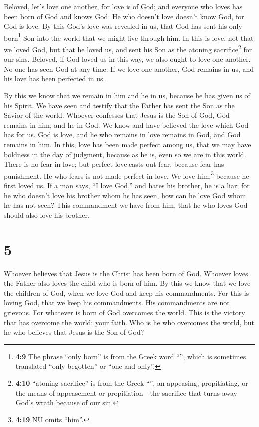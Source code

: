  Beloved, let's love one another, for love is of God; and
everyone who loves has been born of God and knows God.  He
who doesn't love doesn't know God, for God is love.  By
this God's love was revealed in us, that God has sent his only
born\footnote{\textbf{4:9} The phrase ``only born'' is from the Greek
  word ``'', which is sometimes translated ``only
  begotten'' or ``one and only''.} Son into the world that we might live
through him.  In this is love, not that we loved God, but
that he loved us, and sent his Son as the atoning sacrifice\footnote{\textbf{4:10}
  ``atoning sacrifice'' is from the Greek ``'', an
  appeasing, propitiating, or the means of appeasement or
  propitiation---the sacrifice that turns away God's wrath because of
  our sin.} for our sins.  Beloved, if God loved us in
this way, we also ought to love one another.  No one has
seen God at any time. If we love one another, God remains in us, and his
love has been perfected in us.

 By this we know that we remain in him and he in us,
because he has given us of his Spirit.  We have seen and
testify that the Father has sent the Son as the Savior of the world.
 Whoever confesses that Jesus is the Son of God, God
remains in him, and he in God.  We know and have believed
the love which God has for us. God is love, and he who remains in love
remains in God, and God remains in him.  In this, love
has been made perfect among us, that we may have boldness in the day of
judgment, because as he is, even so we are in this world.
 There is no fear in love; but perfect love casts out
fear, because fear has punishment. He who fears is not made perfect in
love.  We love him,\footnote{\textbf{4:19} NU omits
  ``him''.} because he first loved us.  If a man says,
``I love God,'' and hates his brother, he is a liar; for he who doesn't
love his brother whom he has seen, how can he love God whom he has not
seen?  This commandment we have from him, that he who
loves God should also love his brother.

\hypertarget{section-4}{%
\section{5}\label{section-4}}

 Whoever believes that Jesus is the Christ has been born
of God. Whoever loves the Father also loves the child who is born of
him.  By this we know that we love the children of God,
when we love God and keep his commandments.  For this is
loving God, that we keep his commandments. His commandments are not
grievous.  For whatever is born of God overcomes the
world. This is the victory that has overcome the world: your faith.
 Who is he who overcomes the world, but he who believes
that Jesus is the Son of God?


